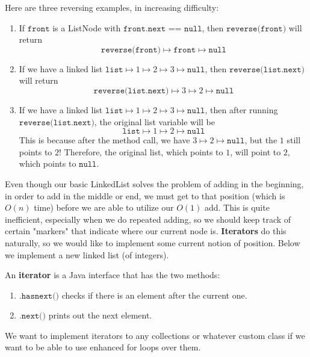   \begin{example}
    Here are three reversing examples, in increasing difficulty: 
    \begin{enumerate}
      \item If $\texttt{front}$ is a ListNode with $\texttt{front.next == null}$, then $\texttt{reverse(front)}$ will return 
      \[\texttt{reverse(front)} \mapsto \texttt{front} \mapsto \texttt{null}\]

      \item If we have a linked list $\texttt{list} \mapsto 1 \mapsto 2 \mapsto 3 \mapsto \texttt{null}$, then $\texttt{reverse(list.next)}$ will return 
      \[\texttt{reverse(list.next)} \mapsto 3 \mapsto 2 \mapsto \texttt{null} \]

      \item If we have a linked list $\texttt{list} \mapsto 1 \mapsto 2 \mapsto 3 \mapsto \texttt{null}$, then after running $\texttt{reverse(list.next)}$, the original list variable will be 
      \[\texttt{list} \mapsto 1 \mapsto 2 \mapsto \texttt{null}\]
      This is because after the method call, we have $3 \mapsto 2 \mapsto \texttt{null}$, but the $1$ still points to $2$! Therefore, the original list, which points to $1$, will point to $2$, which points to $\texttt{null}$. 
    \end{enumerate}
  \end{example}

  Even though our basic LinkedList solves the problem of adding in the beginning, in order to add in the middle or end, we must get to that position (which is $O(n)$ time) before we are able to utilize our $O(1)$ add. This is quite inefficient, especially when we do repeated adding, so we should keep track of certain "markers" that indicate where our current node is. \textbf{Iterators} do this naturally, so we would like to implement some current notion of position. Below we implement a new linked list (of integers). 

  \begin{definition}[Iterator]
  An \textbf{iterator} is a Java interface that has the two methods: 
  \begin{enumerate}
      \item $\texttt{.hasnext()}$ checks if there is an element after the current one. 
      \item $\texttt{.next()}$ prints out the next element. 
  \end{enumerate}
  We want to implement iterators to any collections or whatever custom class if we want to be able to use enhanced for loops over them. 
  \end{definition}

